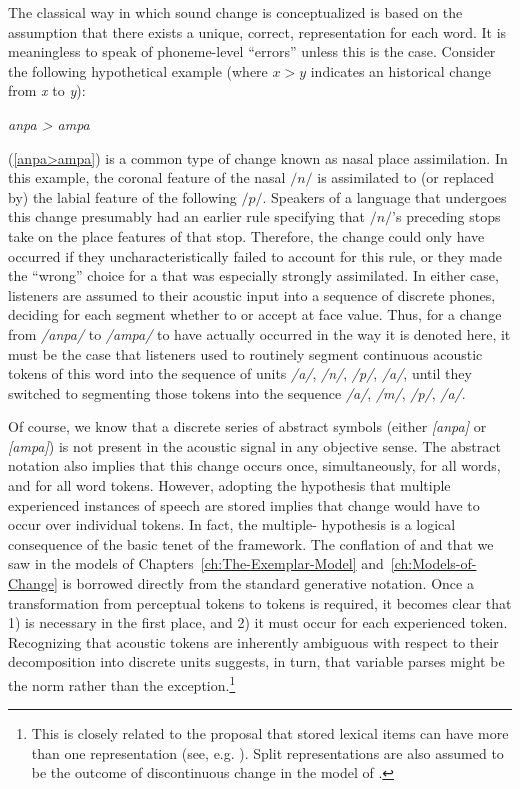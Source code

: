 The classical way in which sound change is conceptualized is based
on the assumption that there exists a unique, correct, 
representation for each word. It is meaningless to speak of phoneme-level
“errors” unless this is the case. Consider the following hypothetical
example (where \emph{$x>y$} indicates an historical change from \emph{x}
to \emph{y}):
\begin{covexamples}
\item \label{anpa>ampa}\emph{anpa \textgreater{} ampa}
\end{covexamples}
(\ref{anpa>ampa}) is a common type of change known as nasal place
assimilation. In this example, the coronal feature of the nasal $/n/$
is assimilated to (or replaced by) the labial feature of the following
$/p/$. Speakers of a language that undergoes this change presumably
had an earlier  rule specifying that $/n/$'s preceding
stops take on the place features of that stop. Therefore, the change
could only have occurred if they uncharacteristically failed to account
for this rule, or they made the “wrong” choice for a 
that was especially strongly assimilated. In either case, listeners
are assumed to  their acoustic input into a sequence of discrete
phones, deciding for each segment whether to  or accept at
face value. Thus, for a change from \emph{/anpa/} to \emph{/ampa/}
to have actually occurred in the way it is denoted here, it must be
the case that listeners used to routinely segment continuous acoustic
tokens of this word into the sequence of units \emph{/a/}, \emph{/n/},
\emph{/p/}, \emph{/a/}, until they switched to segmenting
those tokens into the sequence \emph{/a/}, \emph{/m/}, \emph{/p/},
\emph{/a/}. 

Of course, we know that a discrete series of abstract symbols (either
\emph{[anpa]} or \emph{[ampa]}) is not present in the acoustic
signal in any objective sense. The abstract notation also implies
that this change occurs once, simultaneously, for all words, and for
all word tokens. However, adopting the hypothesis that multiple experienced
instances of speech are stored implies that change would have to occur
over individual tokens. In fact, the multiple- hypothesis is
a logical consequence of the basic tenet of the  framework.
The conflation of  and  that we saw in the  models of Chapters~\ref{ch:The-Exemplar-Model} and~\ref{ch:Models-of-Change}
is borrowed directly from the standard generative notation. Once a
transformation from perceptual tokens to  tokens is required,
it becomes clear that 1)  is necessary in the first place,
and 2) it must occur for each experienced token. Recognizing
that acoustic tokens are inherently ambiguous with respect to their
decomposition into discrete units suggests, in turn, that variable
parses might be the norm rather than the exception.\footnote{This is closely related to the proposal that stored lexical items
can have more than one representation (see, e.g. \citealp{hooper1976word,Janda2008,Bybee2001}).
Split representations are also assumed to be the outcome of discontinuous
 change in the model of \citet{Garrett2013}.} 

